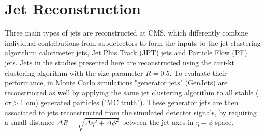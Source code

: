 \section{Jet Reconstruction}

\label{sec:jets}

Three main types of jets are reconstructed at CMS,  which differently combine
individual contributions from subdetectors to form the inputs
to the jet clustering algorithm: calorimeter jets, 
Jet Plus Track (JPT) jets and  Particle Flow (PF) jets.
Jets in the studies presented here are reconstructed using the anti-kt~\cite{bib:akt}
clustering algorithm with the size parameter $R=0.5$.
To evaluate their performance, in Monte Carlo simulations 
"generator jets" (GenJets)
are reconstructed as well by applying the same jet clustering algorithm to all stable 
($c\tau > 1$ cm) generated particles ("MC truth"). 
These generator jets are then associated to jets
reconstructed from the simulated detector signals, 
by requiring a small distance 
$\Delta R = \sqrt{\Delta\eta^2+\Delta\phi^2}$
between the jet axes 
in $\eta-\phi$ space.

